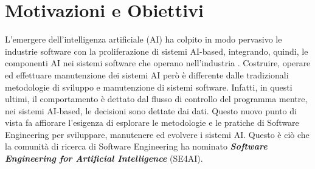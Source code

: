 \section{Motivazioni e Obiettivi} %
L'emergere dell'intelligenza artificiale (AI) ha colpito in modo pervasivo le industrie software con la proliferazione di sistemi AI-based, integrando, quindi, le componenti AI nei sistemi software che operano nell'industria \cite{AnthesAI}.
Costruire, operare ed effettuare manutenzione dei sistemi AI però è differente dalle tradizionali metodologie di sviluppo e manutenzione di sistemi software. Infatti, in questi ultimi, il comportamento è dettato dal flusso di controllo del programma mentre, nei sistemi AI-based, le decisioni sono dettate dai dati. Questo nuovo punto di vista fa affiorare l'esigenza di esplorare le metodologie e le pratiche di Software Engineering per sviluppare, manutenere ed evolvere i sistemi AI. Questo è ciò che la comunità di ricerca di Software Engineering ha nominato \textbf{\textit{Software Engineering for Artificial Intelligence}} (SE4AI).

